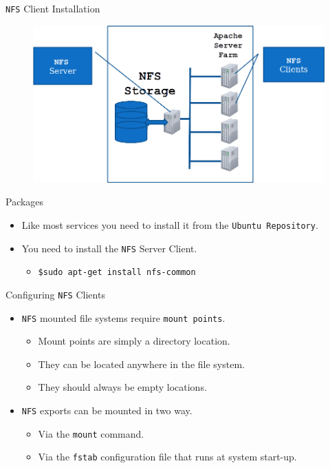 \documentclass[xcolor=table,aspectratio=169]{beamer}
\begin{document}
\begin{frame}{\texttt{NFS} Client Installation}
  \begin{figure}
    \begin{center}
      \includegraphics[width=0.7\linewidth]{NFSClients.png}
    \end{center}
  \end{figure}
\end{frame}

\begin{frame}{Packages}
  \begin{itemize}
    \item Like most services you need to install it from the \texttt{Ubuntu Repository}.
    \item You need to install the \texttt{NFS} Server Client.
      \begin{itemize}
        \item \texttt{\$sudo apt-get install nfs-common}
      \end{itemize}
  \end{itemize}
\end{frame}

\begin{frame}{Configuring \texttt{NFS} Clients}
  \begin{itemize}
    \item \texttt{NFS} mounted file systems require \texttt{mount points}.
      \begin{itemize}
        \item Mount points are simply a directory location.
        \item They can be located anywhere in the file system.
        \item They should always be empty locations.
      \end{itemize}
    \item \texttt{NFS} exports can be mounted in two way. 
      \begin{itemize}
        \item Via the \texttt{mount} command. 
        \item Via the \texttt{fstab} configuration file that runs at system start-up.
      \end{itemize}
  \end{itemize}
\end{frame}
\end{document}
